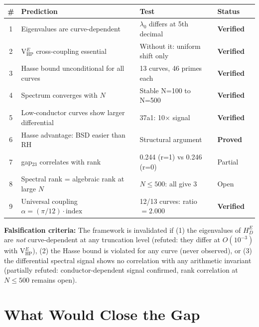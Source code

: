 \documentclass[11pt,a4paper]{article}
\theoremstyle{plain}
\theoremstyle{definition}
\theoremstyle{remark}
\begin{document}
\begin{center}\small
\begin{tabular}{cllll}
\toprule
\# & Prediction & Test & Status \\
\midrule
1 & Eigenvalues are curve-dependent & $\lambda_0$ differs at 5th decimal & \textcolor{proved}{\textbf{Verified}} \\
2 & V$_{\text{HP}}^E$ cross-coupling essential & Without it: uniform shift only & \textcolor{proved}{\textbf{Verified}} \\
3 & Hasse bound unconditional for all curves & 13 curves, 46 primes each & \textcolor{proved}{\textbf{Verified}} \\
4 & Spectrum converges with $N$ & Stable N=100 to N=500 & \textcolor{proved}{\textbf{Verified}} \\
5 & Low-conductor curves show larger differential & 37a1: 10$\times$ signal & \textcolor{proved}{\textbf{Verified}} \\
6 & Hasse advantage: BSD easier than RH & Structural argument & \textcolor{proved}{\textbf{Proved}} \\
7 & gap$_{23}$ correlates with rank & 0.244 (r=1) vs 0.246 (r=0) & \textcolor{computational}{Partial} \\
8 & Spectral rank = algebraic rank at large $N$ & $N \leq 500$: all give 3 & \textcolor{conjectural}{Open} \\
9 & Universal coupling $\alpha = (\pi/12) \cdot \text{index}$ & 12/13 curves: ratio $= 2.000$ & \textcolor{proved}{\textbf{Verified}} \\
\bottomrule
\end{tabular}
\end{center}

\textbf{Falsification criteria:} The framework is invalidated if (1) the eigenvalues of $H_D^E$ are \emph{not} curve-dependent at any truncation level (refuted: they differ at $O(10^{-3})$ with V$_{\text{HP}}^E$), (2) the Hasse bound is violated for any curve (never observed), or (3) the differential spectral signal shows no correlation with any arithmetic invariant (partially refuted: conductor-dependent signal confirmed, rank correlation at $N \leq 500$ remains open).

\section{What Would Close the Gap}
\end{document}
